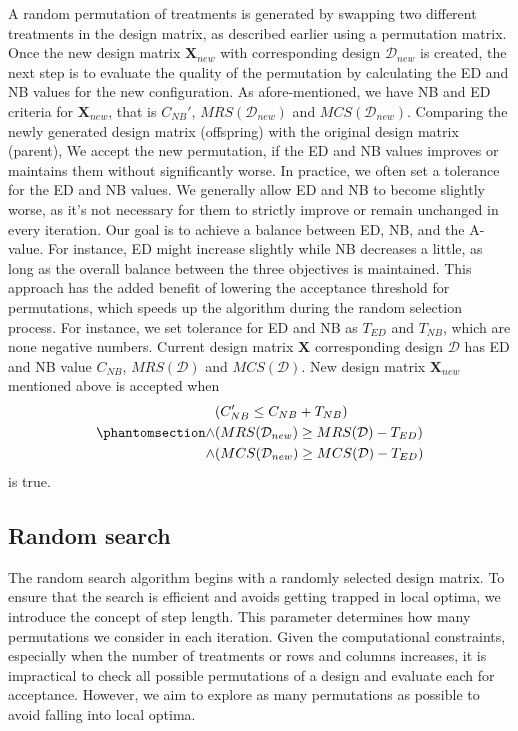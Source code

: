 \documentclass[
  a4paper,
  oneside,
  openany,
  12pt,
  onecolumn]{book}
\theoremstyle{definition}
\theoremstyle{definition}
\theoremstyle{plain}
\theoremstyle{remark}
\begin{document}
A random permutation of treatments is generated by swapping two
different treatments in the design matrix, as described earlier using a
permutation matrix. Once the new design matrix \(\boldsymbol{X}_{new}\)
with corresponding design \(\mathcal{D}_{new}\) is created, the next
step is to evaluate the quality of the permutation by calculating the ED
and NB values for the new configuration. As afore-mentioned, we have NB
and ED criteria for \(\boldsymbol{X}_{new}\), that is \(C_{NB}'\),
\(MRS(\mathcal{D}_{new})\) and \(MCS(\mathcal{D}_{new})\). Comparing the
newly generated design matrix (offspring) with the original design
matrix (parent), We accept the new permutation, if the ED and NB values
improves or maintains them without significantly worse. In practice, we
often set a tolerance for the ED and NB values. We generally allow ED
and NB to become slightly worse, as it's not necessary for them to
strictly improve or remain unchanged in every iteration. Our goal is to
achieve a balance between ED, NB, and the A-value. For instance, ED
might increase slightly while NB decreases a little, as long as the
overall balance between the three objectives is maintained. This
approach has the added benefit of lowering the acceptance threshold for
permutations, which speeds up the algorithm during the random selection
process. For instance, we set tolerance for ED and NB as \(T_{ED}\) and
\(T_{NB}\), which are none negative numbers. Current design matrix
\(\boldsymbol{X}\) corresponding design \(\mathcal{D}\) has ED and NB
value \(C_{NB}\), \(MRS(\mathcal{D})\) and \(MCS(\mathcal{D})\). New
design matrix \(\boldsymbol{X}_{new}\) mentioned above is accepted when
\begin{equation}\phantomsection\label{eq-accp}{\begin{aligned}
&(C_{NB}'\leq C_{NB}+T_{NB}) \\
\land & (MRS(\mathcal{D}_{new})\geq MRS(\mathcal{D})-T_{ED})\\
\land & (MCS(\mathcal{D}_{new})\geq MCS(\mathcal{D})-T_{ED})
\end{aligned}}\end{equation} is true.

\subsection{Random search}\label{random-search}

The random search algorithm begins with a randomly selected design
matrix. To ensure that the search is efficient and avoids getting
trapped in local optima, we introduce the concept of step length. This
parameter determines how many permutations we consider in each
iteration. Given the computational constraints, especially when the
number of treatments or rows and columns increases, it is impractical to
check all possible permutations of a design and evaluate each for
acceptance. However, we aim to explore as many permutations as possible
to avoid falling into local optima.
\end{document}
